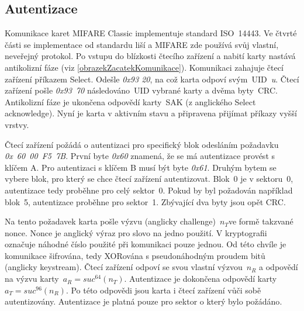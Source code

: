 \subsection{Autentizace}
Komunikace karet MIFARE Classic implementuje standard ISO~14443. Ve čtvrté části se implementace od standardu liší a MIFARE zde používá svůj vlastní, neveřejný protokol. Po vstupu do blízkosti čtecího zařízení a nabití karty nastává antikolizní fáze (viz \ref{obrazekZacatekKomunikace}). Komunikaci zahajuje čtecí zařízení příkazem Select. Odešle \emph{0x93 20}, na což karta odpoví svým~UID~\emph{u}. Čtecí zařízení pošle \emph{0x93~70} následováno~UID vybrané karty a dvěma byty~CRC. Antikolizní fáze je ukončena odpovědí karty~SAK (z anglického Select acknowledge). Nyní je karta v aktivním stavu a připravena přijímat příkazy vyšší vrstvy\cite{PracticalAttackOnMIFARE}.
\par
Čtecí zařízení požádá o autentizaci pro specifický blok odesláním požadavku \emph{0x~60~00~F5~7B}. První byte \emph{0x60} znamená, že se má autentizace provést s klíčem A. Pro autentizaci s klíčem B musí být byte \emph{0x61}. Druhým bytem se vybere blok, pro který se chce čtecí zařízení autentizovat. Blok~0 je v sektoru~0, autentizace tedy proběhne pro celý sektor~0. Pokud by byl požadován například blok~5, autentizace proběhne pro sektor~1. Zbývající dva byty jsou opět CRC\cite{PracticalAttackOnMIFARE}. 
\par
Na tento požadavek karta pošle výzvu (anglicky challenge)~${n_T}$\footnotemark ve formě takzvané nonce\cite{Wirelessly_Pickpocketing}. Nonce je anglický výraz pro slovo na jedno použití. V kryptografii označuje náhodné číslo použité při komunikaci pouze jednou\cite{Nonce_Based_Encryption}. Od této chvíle je komunikace šifrována, tedy XORována s pseudonáhodným proudem bitů (anglicky keystream). Čtecí zařízení odpoví se svou vlastní výzvou~${n_R}$ a odpovědí na výzvu karty~${a_R = suc^{64}(n_T)}$. Autentizace je dokončena odpovědí karty~${a_T = suc^{96}(n_R)}$. Po této odpovědi jsou karta i čtecí zařízení vůči sobě autentizovány. Autentizace je platná pouze pro sektor o který bylo požádáno\cite{Wirelessly_Pickpocketing}. 



